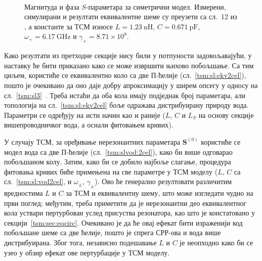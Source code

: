\documentclass[main.tex]{subfiles}
\begin{document}
\begin{figure}[!t]
\centering
{}\\
\caption{Магнитуда и фаза $S$-параметара за симетрични модел. Измерени, симулирани и резултати еквивалентне шеме су преузети са сл.~12 из \cite{radoman}, а константе за ТСМ износе $L=\SI{1.23}{\nano\henry}$, $C=\SI{0.671}{\pico\farad}$, $\omega_+ = \SI{6.17}{\giga\hertz}$ и $\gamma_+ = 8.71 \times 10^8$.}
\label{tsm:rez:pod180sim}
\end{figure}

Како резултати из претходне секције нису били у потпуности задовољавајући, у наставку ће бити приказано како се може извршити њихово побољшање. Са тим циљем, користиће се еквивалентно коло са две П-ћелије (сл.~\ref{tsm:sl:ekv2cel}), пошто је очекивано да оно даје добру апроксимацију у ширем опсегу у односу на сл.~\ref{tsm:sl3}~\cite{radoman}. Треба истаћи да оба кола имају подједнак број параметара, али топологија на сл.~\ref{tsm:sl:ekv2cel} боље одражава дистрибуирану природу вода. Параметри се одређују на исти начин као и раније ($L$, $C$ и $L_S$ на основу секције вишепроводничког вода, а оснали фитовањем кривих).

У случају ТСМ, за оређивање нерезонантних параметара $\mathbf{S}^{(0)}$ користиће се модел вода са две П-ћелије (сл.~\ref{tsm:slvod:2cel}), како би више одговарао побољшаном колу. Затим, како би се добило најбоље слагање, процедура фитовања кривих биће примењена на све параметре у ТСМ моделу ($L$, $C$ са сл.~\ref{tsm:sl:vod2cel}, и $\omega_\pm$, $\gamma_\pm$). Ово ће генерално резултовати различитим вредностима $L$ и $C$ за ТСМ и еквивалентну шему, што може изгледати чудно на први поглед; међутим, треба приметити да је нерезонантни део еквивалентног кола уствари пертурбован услед присуства резонатора, као што је констатовано у секцији~\ref{tsm:sec:eqcirc}. Очекивано је да ће овај ефекат бити израженији код побољшане шеме са две ћелије, пошто је спрега СРР-ова и вода више дистрибуирана. Због тога, независно подешавање $L$ и $C$ је неопходно како би се узео у обзир ефекат ове пертурбације у ТСМ моделу.
\end{document}
